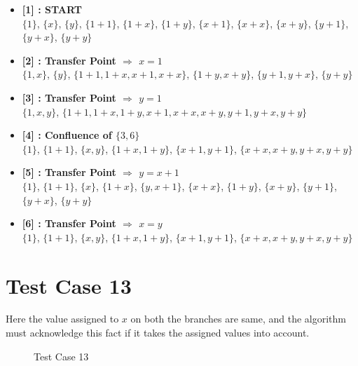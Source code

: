 \begin{itemize}

    \item \textbf{[1] : START}\\
        $\{1\}$, $\{x\}$, $\{y\}$, $\{1 + 1\}$, $\{1 + x\}$, $\{1 + y\}$, $\{x + 1\}$, $\{x + x\}$, $\{x + y\}$, $\{y + 1\}$, $\{y + x\}$, $\{y + y\}$

    \item \textbf{[2] : Transfer Point $\Rightarrow$ $x = 1$}\\
        $\{1, x\}$, $\{y\}$, $\{1 + 1, 1 + x, x + 1, x + x\}$, $\{1 + y, x + y\}$, $\{y + 1, y + x\}$, $\{y + y\}$

    \item \textbf{[3] : Transfer Point $\Rightarrow$ $y = 1$}\\
        $\{1, x, y\}$, $\{1 + 1, 1 + x, 1 + y, x + 1, x + x, x + y, y + 1, y + x, y + y\}$

    \item \textbf{[4] : Confluence of $\{3, 6\}$}\\
        $\{1\}$, $\{1 + 1\}$, $\{x, y\}$, $\{1 + x, 1 + y\}$, $\{x + 1, y + 1\}$, $\{x + x, x + y, y + x, y + y\}$

    \item \textbf{[5] : Transfer Point $\Rightarrow$ $y = x + 1$}\\
        $\{1\}$, $\{1 + 1\}$, $\{x\}$, $\{1 + x\}$, $\{y, x + 1\}$, $\{x + x\}$, $\{1 + y\}$, $\{x + y\}$, $\{y + 1\}$, $\{y + x\}$, $\{y + y\}$

    \item \textbf{[6] : Transfer Point $\Rightarrow$ $x = y$}\\
        $\{1\}$, $\{1 + 1\}$, $\{x, y\}$, $\{1 + x, 1 + y\}$, $\{x + 1, y + 1\}$, $\{x + x, x + y, y + x, y + y\}$

\end{itemize}

\section{Test Case 13}
\label{sec:tc13}
Here the value assigned to $x$ on both the branches are same, and the algorithm
must acknowledge this fact if it takes the assigned values into account.

\begin{figure}[H]
\label{fig:tc13}
     \caption{Test Case 13}
\end{figure}

